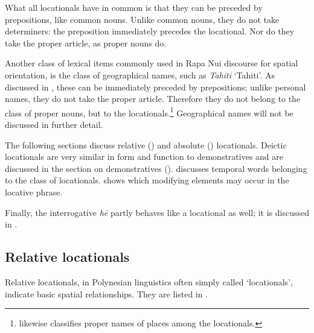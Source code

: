 What all locationals have in common is that they can be preceded by prepositions, like common nouns. Unlike common nouns, they do not take determiners: the preposition immediately precedes the locational. Nor do they take the proper article, as proper nouns do.

Another class of lexical items commonly used in Rapa Nui discourse for spatial orientation, is the class of geographical names, such as \textit{Tahiti} ‘Tahiti’. As discussed in , these can be immediately preceded by prepositions; unlike personal names, they do not take the proper article. Therefore they do not belong to the class of proper nouns, but to the locationals.\footnote{\label{fn:140}\citet[54]{Clark1976} likewise classifies proper names of places among the locationals.}  Geographical names will not be discussed in further detail. 

The following sections discuss relative () and absolute () locationals. Deictic locationals are very similar in form and function to demonstratives and are discussed in the section on demonstratives ().  discusses temporal words belonging to the class of locationals.  shows which modifying elements may occur in the locative phrase.

Finally, the interrogative \textit{hē} partly behaves like a locational as well; it is discussed in .

\subsection{Relative locationals}\label{sec:3.6.2}
Relative locationals, in Polynesian linguistics often simply called ‘locationals’, indicate basic spatial relationships. They are listed in . 

